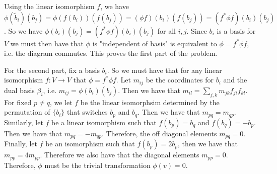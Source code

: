 Using the linear isomorphism \(f\), we have \(\phi(\tilde b_i)(b_j) = \phi(f(b_i))(f(b_j)) = (\phi f)(b_i)(f(b_j)) = (f^* \phi f)(b_i)(b_j)\). So we have \(\phi(b_i)(b_j) = (f^*\phi f)(b_i)(b_j)\)
for all \(i, j\). Since \(b_i\) is a basis for \(V\) we must then have that \(\phi\) is "independent of basis" is equivalent to \(\phi = f^* \phi f\), i.e. the diagram commutes. This proves the
first part of the problem.

For the second part, fix a basis \(b_i\). So we must have that for any linear isomorphism \(f: V \to V\) that \(\phi = f^* \phi f\). Let \(m_{ij}\) be the coordinates for \(b_i\) and the dual
basis \(\beta_i\), i.e. \(m_{ij} = \phi(b_i)(b_j)\). Then we have that \(m_{il} = \sum_{j, k} m_{jk}f_{ji}f_{kl}\). For fixed \(p \neq q\), we let \(f\) be the linear isomorphsim determined by
the permutation of \(\{b_i\}\) that switches \(b_p\) and \(b_q\). Then we have that \(m_{pq} = m_{qp}\). Similarly, let \(f\) be a linear isomorphism such that \(f(b_p) = b_q\) and \(f(b_q) = -b_p\).
Then we have that \(m_{pq} = -m_{qp}\). Therefore, the off diagonal elements \(m_{pq} = 0\). Finally, let \(f\) be an isomorphism such that \(f(b_p) = 2b_p\), then we have that
\(m_{pp} = 4 m_{pp} \). Therefore we also have that the diagonal elements \(m_{pp} = 0\). Therefore, \(\phi\) must be the trivial transformation \(\phi(v) = 0\). 


